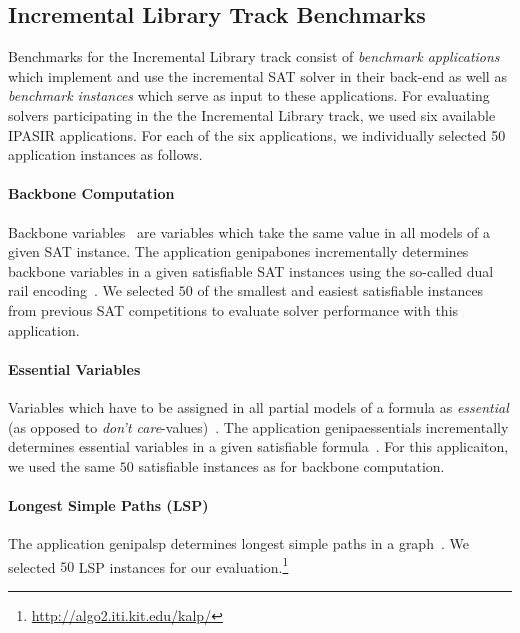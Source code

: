 \documentclass{elsarticle}
\begin{document}
\subsection{Incremental Library Track Benchmarks}

Benchmarks for the Incremental Library track consist of \emph{benchmark applications} which implement and use the incremental SAT solver in their back-end as well as \emph{benchmark instances} which serve as input to these applications. 
For evaluating solvers participating in the 
the Incremental Library track, we used six available IPASIR applications.
For each of the six applications, we individually selected 50 application instances as follows. 

\paragraph{Backbone Computation}

Backbone variables~\cite{Monasson:1999,Janota:2015:Backbones} are variables which take the same value in all models of a given SAT instance.
The application \textsf{genipabones} incrementally determines backbone variables in a given satisfiable SAT instances using the so-called 
dual rail encoding~\cite{Balyo:2015:SATRace}.
We selected $50$ of the smallest and easiest satisfiable instances from previous SAT competitions to evaluate solver performance with this application. 

\paragraph{Essential Variables}

Variables which have to be assigned in all partial models of a formula as \emph{essential} (as opposed to \emph{don't care}-values)~\cite{Bryant:1987:Essentials}. 
The application \textsf{genipaessentials} incrementally determines essential variables in a given satisfiable formula~\cite{Balyo:2015:SATRace}. 
For this applicaiton, we used the same $50$  satisfiable instances as for  backbone computation.

\paragraph{Longest Simple Paths (LSP)}

The application \textsf{genipalsp} determines longest simple paths in a graph~\cite{Balyo:2019:LSP}. 
We selected $50$ LSP instances for our evaluation.\footnote{\url{http://algo2.iti.kit.edu/kalp/}} 
\end{document}
